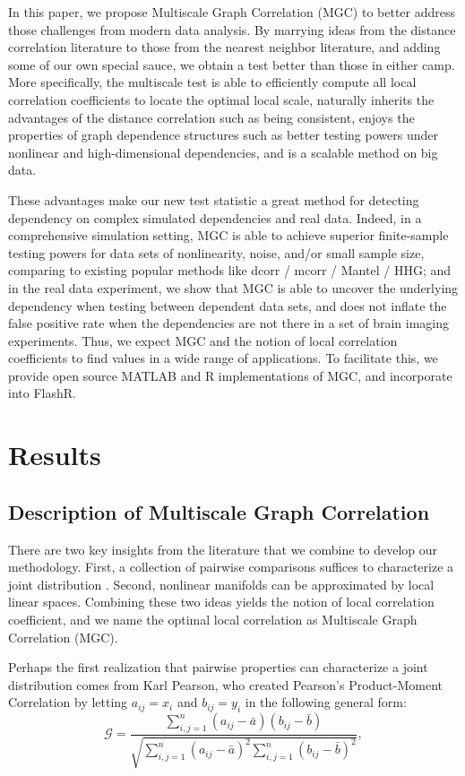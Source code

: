 \documentclass[11pt]{article}
\newcommand{\G}{\mathcal{G}}
\begin{document}
In this paper, we propose Multiscale Graph Correlation (MGC) to better address those challenges from modern data analysis. By marrying ideas from the distance correlation literature to those from the nearest neighbor literature, and adding some of our own special sauce, we obtain a test better than those in either camp.  More specifically,  the multiscale test is able to efficiently compute all local correlation coefficients to locate the optimal local scale, naturally inherits the advantages of the distance correlation such as being consistent, enjoys the properties of graph dependence structures such as better testing powers under nonlinear and high-dimensional dependencies, and is a scalable method on big data. 

These advantages make our new test statistic a great method for detecting dependency on complex simulated dependencies and real data. Indeed, in a comprehensive simulation setting, MGC is able to achieve superior finite-sample testing powers for data sets of nonlinearity, noise, and/or small sample size, comparing to existing popular methods like dcorr / mcorr / Mantel / HHG; and in the real data experiment, we show that MGC is able to uncover the underlying dependency when testing between dependent data sets,  and does not inflate the false positive rate when the dependencies are not there in a set of brain imaging experiments. Thus, we expect MGC and the notion of local correlation coefficients to find values in a wide range of applications.  To facilitate this, we provide open source MATLAB and R implementations of MGC, and incorporate into FlashR.

\section{Results}
\label{main}
\subsection{Description of Multiscale Graph Correlation}
\label{main1}
There are two key insights from the literature that we combine to develop our methodology.  First, a collection of pairwise comparisons  suffices to characterize a joint distribution \cite{Maa1996}.  Second, nonlinear manifolds can be approximated by local linear spaces.  Combining these two ideas yields the notion of local correlation coefficient, and we name the optimal local correlation as Multiscale Graph Correlation (MGC).  

Perhaps the first realization that pairwise properties can characterize a joint distribution comes from  Karl Pearson, who created Pearson's Product-Moment Correlation \cite{Pearson1895} by letting $a_{ij}=x_i$ and $b_{ij}=y_i$ in the following general form:
\begin{equation}
\label{generalCoef}
\G=\frac{\sum_{i,j=1}^n (a_{ij}-\bar{a}) (b_{ij}-\bar{b})}{\sqrt{\sum_{i,j=1}^n  (a_{ij}-\bar{a})^{2} \sum_{i,j=1}^n (b_{ij}-\bar{b})^{2}}}, 
\end{equation}
\end{document}
